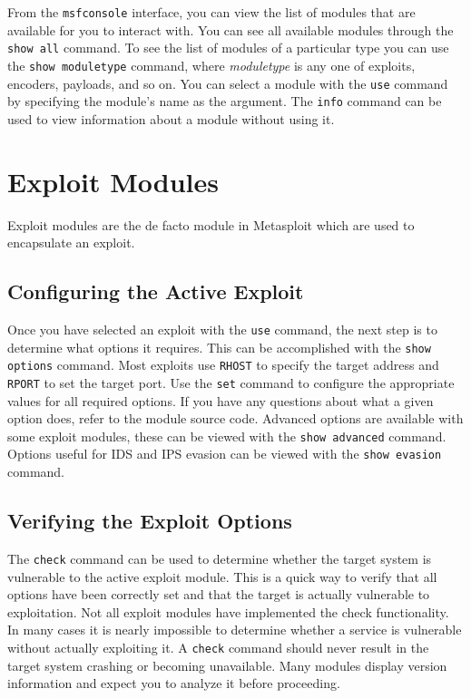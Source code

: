 \documentclass{report}
\begin{document}
\par
From the \texttt{msfconsole} interface, you can view the list of modules that
are available for you to interact with. You can see all available modules
through the \texttt{show all} command. To see the list of modules of a
particular type you can use the \texttt{show moduletype} command, where
\textit{moduletype} is any one of exploits, encoders, payloads, and so on. You
can select a module with the \texttt{use} command by specifying the module's
name as the argument. The \texttt{info} command can be used to view information
about a module without using it.

	\section{Exploit Modules}

\par
Exploit modules are the de facto module in Metasploit which are used to
encapsulate an exploit.

		\subsection{Configuring the Active Exploit}

\par
Once you have selected an exploit with the \texttt{use} command, the next step
is to determine what options it requires. This can be accomplished with the
\texttt{show options} command. Most exploits use \texttt{RHOST} to specify the
target address and \texttt{RPORT} to set the target port. Use the \texttt{set}
command to configure the appropriate values for all required options. If you
have any questions about what a given option does, refer to the module source
code. Advanced options are available with some exploit modules, these can be
viewed with the \texttt{show advanced} command. Options useful for IDS and IPS
evasion can be viewed with the \texttt{show evasion} command.

		\subsection{Verifying the Exploit Options}

\par	
The \texttt{check} command can be used to determine whether the target system is
vulnerable to the active exploit module. This is a quick way to verify that all
options have been correctly set and that the target is actually vulnerable to
exploitation. Not all exploit modules have implemented the check functionality.
In many cases it is nearly impossible to determine whether a service is
vulnerable without actually exploiting it. A \texttt{check} command should never
result in the target system crashing or becoming unavailable. Many modules
display version information and expect you to analyze it before proceeding.
\end{document}
